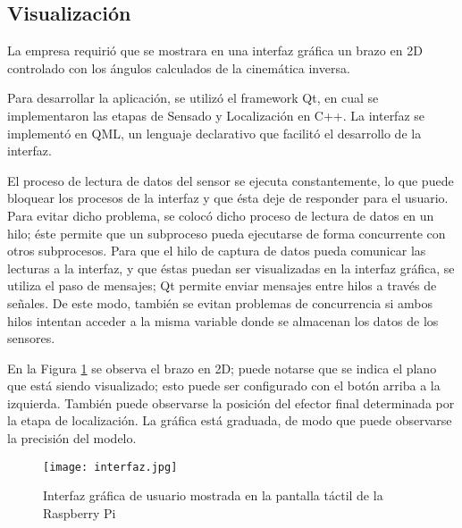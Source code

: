 \subsection{Visualización}

La empresa requirió que se mostrara en una interfaz gráfica un brazo en 2D controlado con los ángulos calculados de la cinemática inversa.

Para desarrollar la aplicación, se utilizó el framework Qt, en cual se implementaron las etapas de Sensado y Localización en C++. La interfaz se implementó en QML, un lenguaje declarativo que facilitó el desarrollo de la interfaz.

El proceso de lectura de datos del sensor se ejecuta constantemente, lo que puede bloquear los procesos de la interfaz y que ésta deje de responder para el usuario. Para evitar dicho problema, se colocó dicho proceso de lectura de datos en un hilo; éste permite que un subproceso pueda ejecutarse de forma concurrente con otros subprocesos. Para que el hilo de captura de datos pueda comunicar las lecturas a la interfaz, y que éstas puedan ser visualizadas en la interfaz gráfica, se utiliza el paso de mensajes; Qt permite enviar mensajes entre hilos a través de señales. De este modo, también se evitan problemas de concurrencia si ambos hilos intentan acceder a la misma variable donde se almacenan los datos de los sensores.

En la Figura \ref{fig:interfaz} se observa el brazo en 2D; puede notarse que se indica el plano que está siendo visualizado; esto puede ser configurado con el botón arriba a la izquierda. También puede observarse la posición del efector final determinada por la etapa de localización. La gráfica está graduada, de modo que puede observarse la precisión del modelo.

\begin{figure}[htb]
	\centering
	\texttt{[image: interfaz.jpg]}
	\caption{Interfaz gráfica de usuario mostrada en la pantalla táctil de la Raspberry Pi}
	\label{fig:interfaz}
\end{figure}